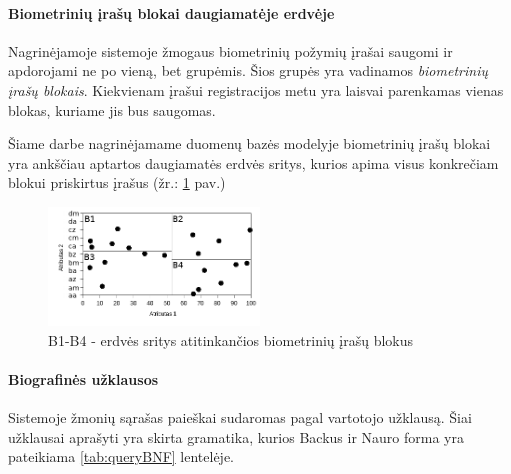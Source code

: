\paragraph{Biometrinių įrašų blokai daugiamatėje erdvėje}

Nagrinėjamoje sistemoje žmogaus biometrinių požymių įrašai saugomi ir apdorojami ne po vieną, bet grupėmis.
Šios grupės yra vadinamos {\it biometrinių įrašų blokais}.
Kiekvienam įrašui registracijos metu yra laisvai parenkamas vienas blokas, kuriame jis bus saugomas.

Šiame darbe nagrinėjamame duomenų bazės modelyje biometrinių įrašų blokai yra ankščiau aptartos daugiamatės erdvės sritys, kurios apima visus konkrečiam blokui priskirtus įrašus (žr.: \ref{img:multidimensionalPartitionedGallery} pav.)

\begin{figure}[H]
\begin{center}
\includegraphics[width=0.5\textwidth]{img/MultidimensionalPartitionedGallery.png}
\caption{B1-B4 - erdvės sritys atitinkančios biometrinių įrašų blokus}
\label{img:multidimensionalPartitionedGallery}
\end{center}
\end{figure}



\paragraph{Biografinės užklausos}

Sistemoje žmonių sąrašas paieškai sudaromas pagal vartotojo užklausą.
Šiai užklausai aprašyti yra skirta gramatika, kurios Backus ir Nauro forma \cite{mccracken2003backus} yra pateikiama \ref{tab:queryBNF} lentelėje.

